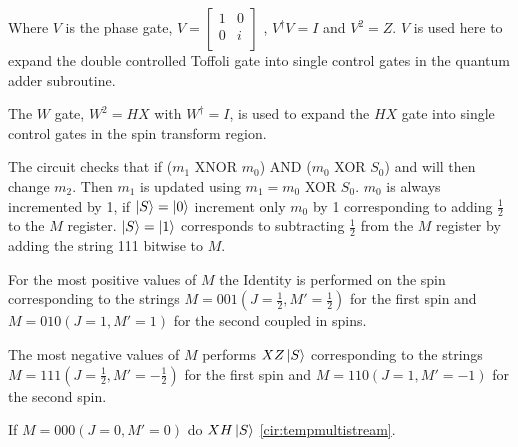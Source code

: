 \documentclass[12pt]{article}
\begin{document}
Where $V$ is the phase gate, 
$ V = \begin{bmatrix}
1 & 0 \\
0 & i \\
\end{bmatrix} $
, $V^{\dag}V = I$ and $V^2 = Z$. $V$ is used here to expand the double controlled Toffoli gate into single control gates in the quantum adder subroutine.

The $W$ gate, $W^2 = HX$ with $W^{\dag} = I$, is used to expand the $HX$ gate into single control gates in the spin transform region. 

The circuit checks that if ($m_1$ XNOR $m_0$) AND ($m_0$ XOR $S_0$) and will then change $m_2$. Then $m_1$ is updated using $m_1 = m_0$ XOR $S_0$. $m_0$ is always incremented by 1, if $\left\vert{S}\right\rangle = \left\vert{0}\right\rangle$ increment only $m_0$ by 1 corresponding to adding $\frac{1}{2}$ to the $M$ register. $\left\vert{S}\right\rangle = \left\vert{1}\right\rangle$ corresponds to subtracting $\frac{1}{2}$ from the $M$ register by adding the string 111 bitwise to $M$. 
 
For the most positive values of $M$ the Identity is performed on the spin corresponding to the strings $M=001 (J=\frac{1}{2}, M' = \frac{1}{2})$ for the first spin and $M=010 (J=1, M'=1) $ for the second coupled in spins. 

The most negative values of $M$ performs $XZ \left\vert{S}\right\rangle$ corresponding to the strings $M=111 (J=\frac{1}{2}, M'=-\frac{1}{2})$ for the first spin and $M=110 (J=1, M'=-1)$ for the second spin.

If $M=000 (J=0, M'=0)$ do $XH \left\vert{S}\right\rangle$ \autoref{cir:tempmultistream}.  












\newpage

\begin{landscape}

\end{landscape}

\end{document}
